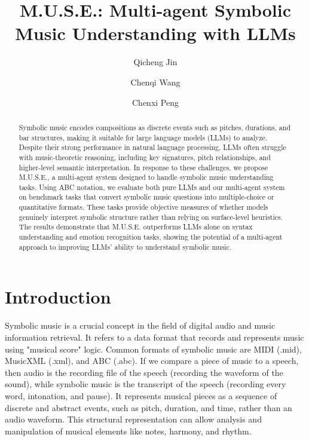 \documentclass[sigconf]{acmart}
\title{\textbf{M.U.S.E.: Multi-agent Symbolic Music Understanding with LLMs}}
\author{Qicheng Jin}
\affiliation{
  \institution{University or Chicago}
  \city{Chicago}
  \country{United States}
}
\author{Chenqi Wang}
\affiliation{
  \institution{University or Chicago}
  \city{Chicago}
  \country{United States}
}
\author{Chenxi Peng}
\affiliation{
  \institution{University or Chicago}
  \city{Chicago}
  \country{United States}
}
\begin{document}
\begin{abstract}
Symbolic music encodes compositions as discrete events such as pitches, durations, and bar structures, making it suitable for large language models (LLMs) to analyze. Despite their strong performance in natural language processing, LLMs often struggle with music-theoretic reasoning, including key signatures, pitch relationships, and higher-level semantic interpretation. In response to these challenges, we propose M.U.S.E., a multi-agent system designed to handle symbolic music understanding tasks. Using ABC notation, we evaluate both pure LLMs and our multi-agent system on benchmark tasks that convert symbolic music questions into multiple-choice or quantitative formats. These tasks provide objective measures of whether models genuinely interpret symbolic structure rather than relying on surface-level heuristics. The results demonstrate that M.U.S.E. outperforms LLMs alone on syntax understanding and emotion recognition tasks, showing the potential of a multi-agent approach to improving LLMs’ ability to understand symbolic music.
\end{abstract}


\maketitle


\section{Introduction}
Symbolic music is a crucial concept in the field of digital audio and music information retrieval. It refers to a data format that records and represents music using "musical score" logic. Common formats of symbolic music are MIDI (.mid), MusicXML (.xml), and ABC (.abc). If we compare a piece of music to a speech, then audio is the recording file of the speech (recording the waveform of the sound), while symbolic music is the transcript of the speech (recording every word, intonation, and pause). It represents musical pieces as a sequence of discrete and abstract events, such as pitch, duration, and time, rather than an audio waveform. This structural representation can allow analysis and manipulation of musical elements like notes, harmony, and rhythm. 
\end{document}

